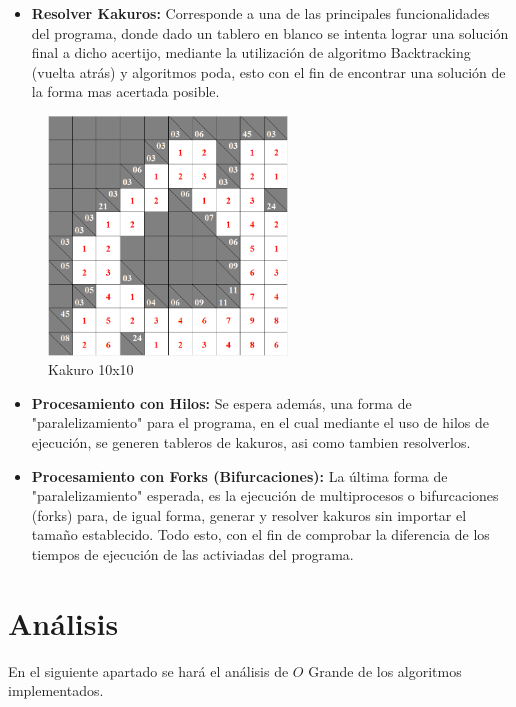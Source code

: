 \documentclass[journal]{IEEEtran}
\begin{document}
	
	\begin{itemize}
	 \item{\bf Resolver Kakuros:} Corresponde a una de las principales funcionalidades del programa, donde dado un tablero en blanco se intenta lograr una solución final a dicho acertijo, mediante la utilización de algoritmo Backtracking (vuelta atrás) y algoritmos poda, esto con el fin de encontrar una solución de la forma mas acertada posible.
	\end{itemize}

		\begin{figure}[h]
		\centering
		\includegraphics[width = 180pt]{Kakuro_10x10.png}
		\caption{Kakuro 10x10}
		\end{figure}

	\begin{itemize}
	\item{\bf Procesamiento con Hilos:} Se espera además, una forma de "paralelizamiento" para el programa, en el cual mediante el uso de hilos de ejecución, se generen tableros de kakuros, asi como tambien resolverlos.
	\end{itemize}

	\begin{itemize}
	\item{\bf Procesamiento con Forks (Bifurcaciones):} La última forma de "paralelizamiento" esperada, es la ejecución de multiprocesos o bifurcaciones (forks) para, de igual forma, generar y resolver kakuros sin importar el tamaño establecido. Todo esto, con el fin de comprobar la diferencia de los tiempos de ejecución de las activiadas del programa.\\
	
	\end{itemize}



\newpage
\section{Análisis}
En el siguiente apartado se hará el análisis de $O$ Grande de los algoritmos implementados.
\end{document}
